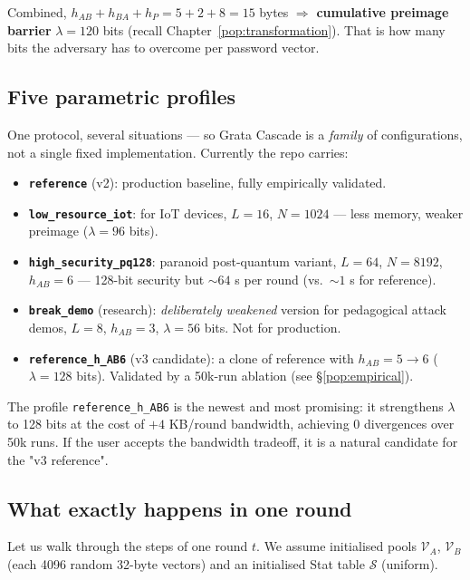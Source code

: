 \documentclass[11pt,a4paper]{article}
\begin{document}
Combined, $h_{AB} + h_{BA} + h_P = 5 + 2 + 8 = 15$ bytes $\Rightarrow$ \textbf{cumulative preimage barrier} $\lambda = 120$ bits (recall Chapter~\ref{pop:transformation}). That is how many bits the adversary has to overcome per password vector.

\subsection{Five parametric profiles}

One protocol, several situations --- so Grata Cascade is a \emph{family} of configurations, not a single fixed implementation. Currently the repo carries:

\begin{itemize}[leftmargin=*]
\item \textbf{\texttt{reference}} (v2): production baseline, fully empirically validated.
\item \textbf{\texttt{low\_resource\_iot}}: for IoT devices, $L = 16$, $N = 1024$ --- less memory, weaker preimage ($\lambda = 96$ bits).
\item \textbf{\texttt{high\_security\_pq128}}: paranoid post-quantum variant, $L = 64$, $N = 8192$, $h_{AB} = 6$ --- 128-bit security but $\sim 64$ s per round (vs.\ $\sim 1$ s for reference).
\item \textbf{\texttt{break\_demo}} (research): \emph{deliberately weakened} version for pedagogical attack demos, $L = 8$, $h_{AB} = 3$, $\lambda = 56$ bits. Not for production.
\item \textbf{\texttt{reference\_h\_AB6}} (v3 candidate): a clone of reference with $h_{AB} = 5 \to 6$ ($\lambda = 128$ bits). Validated by a 50k-run ablation (see §\ref{pop:empirical}).
\end{itemize}

The profile \texttt{reference\_h\_AB6} is the newest and most promising: it strengthens $\lambda$ to 128 bits at the cost of $+4$ KB/round bandwidth, achieving 0 divergences over 50k runs. If the user accepts the bandwidth tradeoff, it is a natural candidate for the "v3 reference".

\subsection{What exactly happens in one round}\label{pop:round-walkthrough}

Let us walk through the steps of one round $t$. We assume initialised pools $\mathcal{V}_A$, $\mathcal{V}_B$ (each 4096 random 32-byte vectors) and an initialised Stat table $\mathcal{S}$ (uniform).
\end{document}
